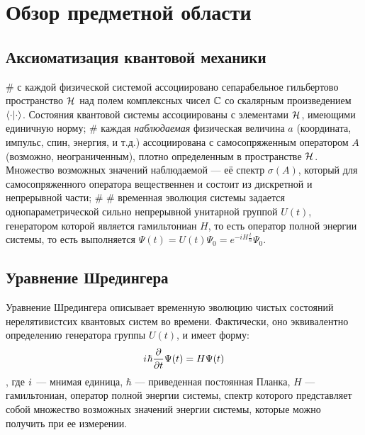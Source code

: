 \chapter{Обзор предметной области}
\label{chapter1}

\section{Аксиоматизация квантовой механики}
\begin{easylist}[itemize]
# с каждой физической системой ассоциировано сепарабельное гильбертово пространство $\mathcal{H}_{}$ над полем комплексных чисел $\mathbb{C}$ со скалярным произведением $\ipcdot$. Состояния квантовой системы ассоциированы с элементами $\mathcal{H}_{}$, имеющими единичную норму;
# каждая \textit{наблюдаемая} физическая величина $a$ (координата, импульс, спин, энергия, и т.д.) ассоциирована с самосопряженным оператором $A$ (возможно, неограниченным), плотно определенным в пространстве $\mathcal{H}_{}$. Множество возможных значений наблюдаемой — её спектр $\sigma(A)$, который для самосопряженного оператора вещественнен и состоит из дискретной и непрерывной части;
# 
# временная эволюция системы задается однопараметрической сильно непрерывной унитарной группой $U(t)$, генератором которой является гамильтониан $H$, то есть оператор полной энергии системы, то есть выполняется $\Psi(t) = U(t) \Psi_0 = e^{-i H \frac{t}{\hbar}} \Psi_0$.
\end{easylist}

\section{Уравнение Шредингера}
Уравнение Шредингера описывает временную эволюцию чистых состояний нерелятивистсих квантовых систем во времени. Фактически, оно эквивалентно определению генератора группы $U(t)$, и имеет форму:
\[
{i\mkern1mu} \hbar \pdv{t} \Psi(t) = H \Psi(t)
\]
, где ${i\mkern1mu}$ — мнимая единица, $\hbar$ — приведенная постоянная Планка, $H$ — гамильтониан, оператор полной энергии системы, спектр которого представляет собой множество возможных значений энергии системы, которые можно получить при ее измерении.


